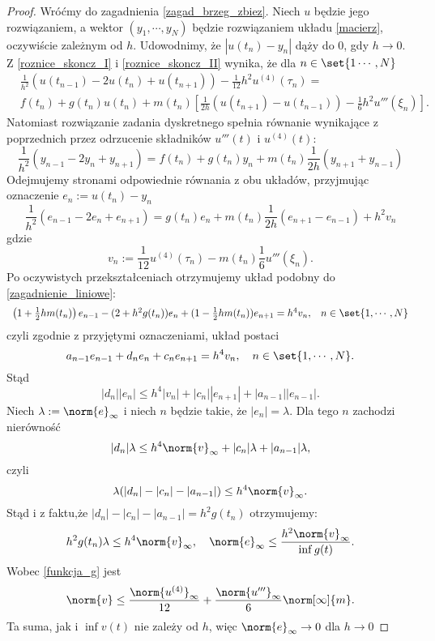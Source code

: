 \begin{proof}
Wróćmy do zagadnienia \eqref{zagad_brzeg_zbiez}. Niech $u$ będzie jego rozwiązaniem, a wektor $(y_1,\cdots,y_N)$ będzie rozwiązaniem układu \eqref{macierz}, oczywiście zależnym od $h$. Udowodnimy, że $|u(t_n) - y_n|$ dąży do $0$, gdy $h \to 0$. Z \eqref{roznice_skoncz_I} i \eqref{roznice_skoncz_II} wynika, że dla $ n \in \set{1\cdots,N}$
\begin{align*}
&\frac{1}{h^2} (u(t_{n-1}) - 2u(t_n) + u(t_{n+1})) - \frac{1}{12}h^2u^{(4)}(\tau_{n}) =\\
&f(t_n) + g(t_n)u(t_n) + m(t_n)\left[\frac{1}{2h}(u(t_{n+1}) - u(t_{n-1})) - \frac{1}{6}h^2u'''(\xi_n)\right].
\end{align*}
Natomiast rozwiązanie zadania dyskretnego spełnia równanie wynikające z poprzednich przez odrzucenie składników $u'''(t)$ i $u^{(4)}(t)$:
$$
\frac{1}{h^2}(y_{n-1} -2y_n + y_{n+1})= f(t_n)+g(t_n) y_n + m(t_n) \frac{1}{2h} (y_{n+1}+y_{n-1})
$$
Odejmujemy stronami odpowiednie równania z obu układów, przyjmując oznaczenie $e_n:=u(t_n) - y_n$
\begin{equation}
\frac{1}{h^2}(e_{n-1} - 2e_n + e_{n+1}) = g(t_n) e_n + m(t_n) \frac{1}{2h}(e_{n+1} - e_{n-1})+ h^2 v_n
\end{equation}
gdzie 
\begin{equation}\label{funkcja_g}
v_n:= \frac{1}{12} u^{(4)}(\tau_n) - m(t_n) \frac{1}{6} u'''(\xi_n).
\end{equation}
Po oczywistych przekształceniach otrzymujemy układ podobny do \eqref{zagadnienie_liniowe}:
$$
\begin{array}{cl}
\left(1+ \frac{1}{2}h m(t_n) \right)e_{n-1} - (2+ h^2 g(t_n) )e_n + (1- \frac{1}{2}h m(t_n) )e_{n+1} = h^4 v_n ,& n \in \set{1,\cdots,N}
\end{array}
$$
czyli zgodnie z przyjętymi oznaczeniami, układ postaci
$$
a_{n-1}e_{n-1} + d_ne_n + c_ne_{n+1} = h^4 v_n, \quad n \in \set{1,\cdots,N}.
$$
Stąd 
$$
|d_n||e_n| \leq h^4|v_n| + |c_n||e_{n+1}| + |a_{n-1}||e_{n-1}|.
$$
Niech $\lambda := {\norm{e}}_\infty$ i niech $n$ będzie takie, że $|e_n| = \lambda$. Dla tego $n$ zachodzi nierówność
$$
|d_n|\lambda \leq h^4 {\norm{v}}_\infty + |c_n|\lambda + |a_{n -1}|\lambda,
$$
czyli 
$$
\lambda(|d_n|-|c_n|-|a_{n-1}|) \leq h^4 {\norm{v}}_\infty.
$$
Stąd i z faktu,że $|d_n|-|c_n|-|a_{n-1}| = h^2 g(t_n)$ otrzymujemy:
$$
h^2 g(t_n) \lambda \leq h^4  {\norm{v}}_\infty, \quad {\norm{e}}_\infty \leq \frac{h^2 {\norm{v}}_\infty}{\inf g(t)}.
$$
Wobec \eqref{funkcja_g} jest
$$
\norm{v} \leq \frac{{\norm{u^{(4)}}}_\infty}{12}+\frac{{\norm{u'''}}_\infty}{6} \norm[\infty]{m}.
$$
Ta suma, jak i $\inf v(t)$ nie zależy od $h$, więc ${\norm{e}}_\infty \to 0$ dla $h \to 0$ 
\end{proof}





